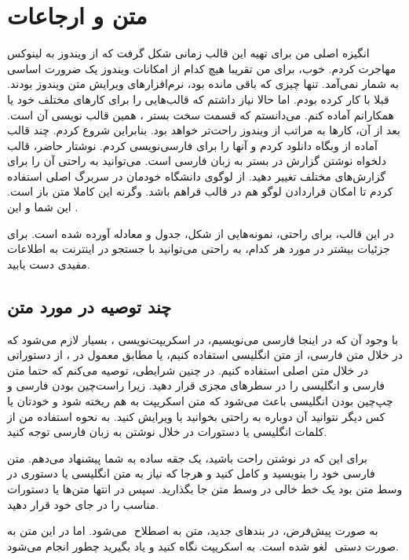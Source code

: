 \chapter{
متن و ارجاعات
}
\label{chap1}

انگیزه اصلی من برای تهیه این قالب زمانی شکل گرفت که از ویندوز به لینوکس مهاجرت کردم. خوب، برای من تقریبا هیچ کدام از امکانات ویندوز یک ضرورت اساسی به شمار نمی‌آمد. تنها چیزی که باقی مانده بود، نرم‌افزارهای ویرایش متن ویندوز بودند. قبلا با
کار کرده بودم. اما حالا نیاز داشتم که قالب‌هایی را برای کارهای مختلف خود یا همکارانم آماده کنم. می‌دانستم که قسمت سخت بستر
، همین قالب نویسی آن است. بعد از آن، کارها به مراتب از ویندوز راحت‌تر خواهد بود. بنابراین شروع کردم. چند قالب آماده از وبگاه
دانلود کردم و آنها را برای فارسی‌نویسی
کردم. نوشتار حاضر، قالب دلخواه نوشتن گزارش در بستر
به زبان فارسی است. می‌توانید به راحتی آن را برای گزارش‌های مختلف تغییر دهید. از لوگوی دانشگاه خودمان در سربرگ اصلی استفاده کردم تا امکان قراردادن لوگو هم در قالب قراهم باشد. وگرنه این کاملا متن باز است. این شما و این
.


در این قالب، برای راحتی، نمونه‌هایی از شکل، جدول و معادله آورده شده است. برای جزئیات بیشتر در مورد هر کدام، به راحتی می‌توانید با جستجو در اینترنت به اطلاعات مفیدی دست یابید. 

\section{ 
چند توصیه در مورد متن
}
\label{sec:text} 

با وجود آن که در اینجا فارسی می‌نویسیم، در اسکریپت‌نویسی
، بسیار لازم می‌شود که در خلال متن فارسی، از متن انگلیسی استفاده کنیم، یا مطابق معمول در
، از دستوراتی در خلال متن اصلی استفاده کنیم. در چنین شرایطی، توصیه می‌کنم که حتما متن فارسی و انگلیسی را در سطرهای مجزی قرار دهید. زیرا راست‌چین بودن فارسی و چپ‌چین بودن انگلیسی باعث می‌شود که متن اسکریپت به هم ریخته شود و خودتان یا کس دیگر نتوانید آن دوباره به راحتی بخوانید یا ویرایش کنید. به نحوه استفاده من از کلمات انگلیسی یا دستورات در خلال نوشتن به زبان فارسی توجه کنید.

برای این که در نوشتن راحت باشید، یک جقه ساده به شما پیشنهاد می‌دهم. متن فارسی خود را بنویسید و کامل کنید و هرجا که نیاز به متن انگلیسی یا دستوری در وسط متن بود یک خط خالی در وسط متن جا بگذارید. سپس در انتها متن‌ها یا دستورات مناسب را در جای خود قرار دهید.

\noindent
به صورت پیش‌فرض، در بندهای جدید، متن به اصطلاح
‌
می‌شود. اما در این متن به صورت دستی
‌
لغو شده است. به اسکریپت نگاه کنید و یاد بگیرید چطور انجام می‌شود.


